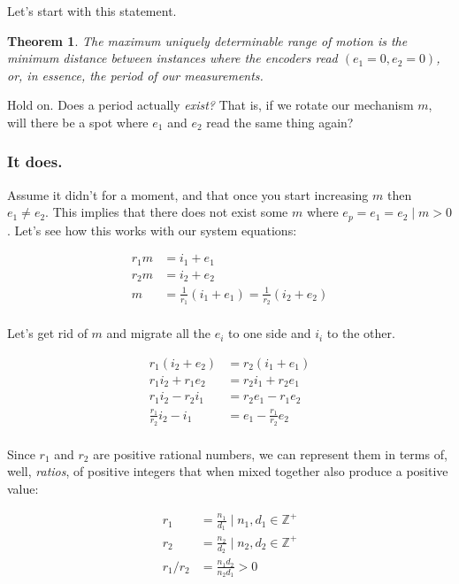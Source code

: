 \documentclass[11pt]{article}
\newtheorem{theorem}{Theorem}[section]
\begin{document}
Let's start with this statement.

\begin{theorem}
    The maximum uniquely determinable range of motion is the minimum distance between instances where the encoders read $(e_1 = 0, e_2 = 0)$, or, in essence, the period of our measurements.
\end{theorem}

\noindent Hold on.  Does a period actually \textit{exist?}
That is, if we rotate our mechanism $m$, will there be a spot where $e_1$ and $e_2$ read the same thing again?

\subsubsection{It does.}

Assume it didn't for a moment, and that once you start increasing $m$ then $e_1 \neq e_2$.
This implies that there does not exist some $m$ where $e_p = e_1 = e_2 \mid m > 0$. 
Let's see how this works with our system equations:

\begin{align*}
    r_1m &= i_1 + e_1\\
    r_2m &= i_2 + e_2\\
    m &= \frac{1}{r_1}(i_1 + e_1) = \frac{1}{r_2}(i_2 + e_2)\\
\end{align*}

\noindent Let's get rid of $m$ and migrate all the $e_i$ to one side and $i_i$ to the other.

\begin{align*}
    r_1(i_2 + e_2) &= r_2(i_1 + e_1)\\
    r_1i_2 + r_1e_2 &= r_2i_1 + r_2e_1\\
    r_1i_2 - r_2i_1 &= r_2e_1 - r_1e_2\\
    \frac{r_1}{r_2}i_2 - i_1 &= e_1 - \frac{r_1}{r_2}e_2 \\
\end{align*}

Since $r_1$ and $r_2$ are positive rational numbers, we can represent them in terms of, well, \textit{ratios}, of positive integers that when mixed together also produce a positive value:

\begin{align*}
    r_1 &= \frac{n_1}{d_1} \mid n_1, d_1 \in \mathbb{Z^+}\\
    r_2 &= \frac{n_2}{d_2} \mid n_2, d_2 \in \mathbb{Z^+}\\
    r_1/r_2 &= \frac{n_1d_2}{n_2d_1} > 0\\
\end{align*}
\end{document}
